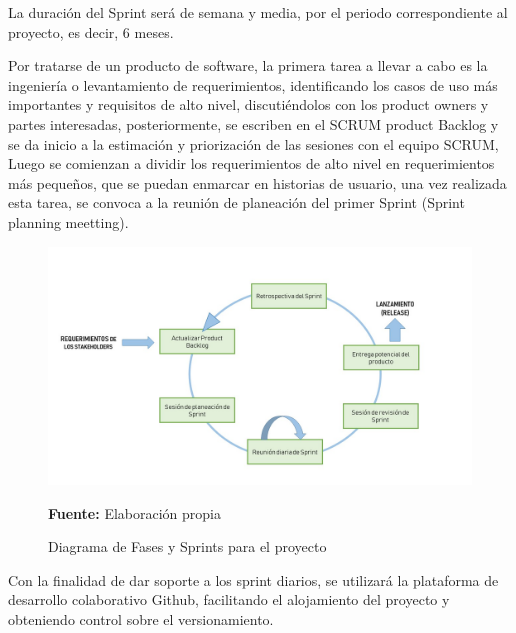 La duración del Sprint será de semana y media, por el periodo correspondiente al proyecto, es decir, 6 meses.

Por tratarse de un producto de software, la primera tarea a llevar a cabo es la ingeniería o levantamiento de requerimientos, identificando los casos de uso más importantes y requisitos de alto nivel, discutiéndolos con los product owners y  partes interesadas, posteriormente, se escriben en el SCRUM product Backlog y se da inicio a la estimación y priorización de las sesiones con el equipo SCRUM, Luego se comienzan a dividir los requerimientos de alto nivel en requerimientos más pequeños, que se puedan enmarcar en historias de usuario, una vez realizada esta tarea, se convoca a la reunión de planeación del primer Sprint (Sprint planning meetting).

\begin{figure}[H]
    \centering
    \includegraphics[width=1\textwidth]{Anexos/LATEX/chapters/images/Scrum_1.jpg}
    \caption{Diagrama de Fases y Sprints para el proyecto}
    \small{\textbf{Fuente:} Elaboración propia}
    \label{SCRUM2}
\end{figure}

Con la finalidad de dar soporte a los sprint diarios, se utilizará la plataforma de desarrollo colaborativo Github, facilitando el alojamiento del proyecto y obteniendo control sobre el versionamiento.




